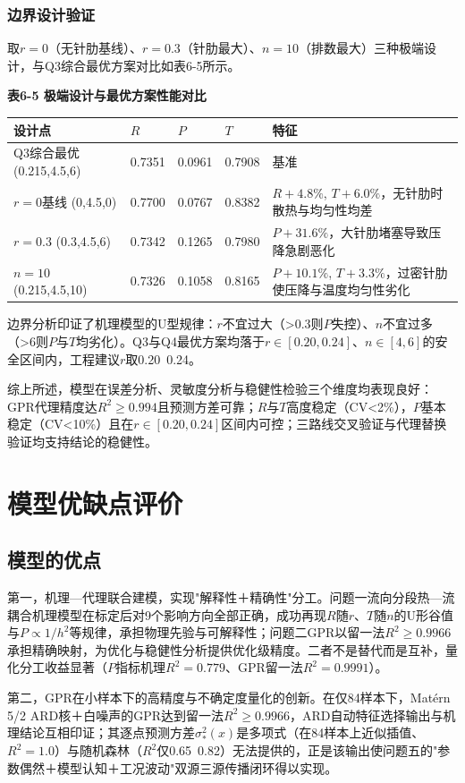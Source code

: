 \documentclass[withoutpreface]{cumcmthesis}
\begin{document}
\subsubsection{边界设计验证}
取$r=0$（无针肋基线）、$r=0.3$（针肋最大）、$n=10$（排数最大）三种极端设计，与Q3综合最优方案对比如表6-5所示。

\textbf{表6-5 极端设计与最优方案性能对比}

\begin{table}[htbp]
\centering
\small
\begin{tabularx}{\textwidth}{XXXXX}
\toprule
设计点 & $R$ & $P$ & $T$ & 特征 \\
\midrule
Q3综合最优 (0.215,4.5,6) & 0.7351 & 0.0961 & 0.7908 & 基准 \\
$r=0$基线 (0,4.5,0) & 0.7700 & 0.0767 & 0.8382 & $R+4.8\%$, $T+6.0\%$，无针肋时散热与均匀性均差 \\
$r=0.3$ (0.3,4.5,6) & 0.7342 & 0.1265 & 0.7980 & $P+31.6\%$，大针肋堵塞导致压降急剧恶化 \\
$n=10$ (0.215,4.5,10) & 0.7326 & 0.1058 & 0.8165 & $P+10.1\%$, $T+3.3\%$，过密针肋使压降与温度均匀性劣化 \\
\bottomrule
\end{tabularx}
\end{table}
边界分析印证了机理模型的U型规律：$r$不宜过大（>0.3则$P$失控）、$n$不宜过多（>6则$P$与$T$均劣化）。Q3与Q4最优方案均落于$r\in[0.20,0.24]$、$n\in[4,6]$的安全区间内，工程建议$r$取0.20~0.24。

综上所述，模型在误差分析、灵敏度分析与稳健性检验三个维度均表现良好：GPR代理精度达$R^2\geq0.994$且预测方差可靠；$R$与$T$高度稳定（CV<2\%），$P$基本稳定（CV<10\%）且在$r\in[0.20,0.24]$区间内可控；三路线交叉验证与代理替换验证均支持结论的稳健性。

\section{模型优缺点评价}
\subsection{模型的优点}
第一，机理—代理联合建模，实现"解释性＋精确性"分工。问题一流向分段热—流耦合机理模型在标定后对9个影响方向全部正确，成功再现$R$随$r$、$T$随$n$的U形谷值与$P\propto1/h^2$等规律，承担物理先验与可解释性；问题二GPR以留一法$R^2\ge0.9966$承担精确映射，为优化与稳健性分析提供优化级精度。二者不是替代而是互补，量化分工收益显著（$P$指标机理$R^2=0.779$、GPR留一法$R^2=0.9991$）。

第二，GPR在小样本下的高精度与不确定度量化的创新。在仅84样本下，Matérn 5/2 ARD核＋白噪声的GPR达到留一法$R^2\ge0.9966$，ARD自动特征选择输出与机理结论互相印证；其逐点预测方差$\sigma_*^2(x)$是多项式（在84样本上近似插值、$R^2=1.0$）与随机森林（$R^2$仅0.65~0.82）无法提供的，正是该输出使问题五的"参数偶然＋模型认知＋工况波动"双源三源传播闭环得以实现。
\end{document}
